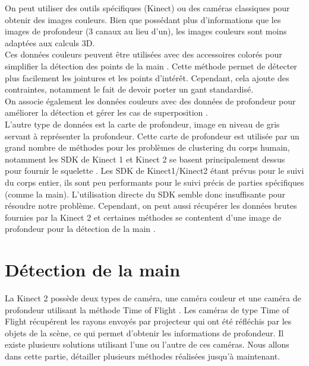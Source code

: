 On peut utiliser des outils spécifiques (Kinect) ou des caméras classiques pour obtenir des images couleurs.
Bien que possédant plus d'informations que les images de profondeur (3 canaux au lieu d'un), les images couleurs sont moins adaptées aux calculs 3D.\\

Ces données couleurs peuvent être utilisées avec des accessoires colorés pour simplifier la détection des points de la main \cite{wang2009real}.
Cette méthode permet de détecter plus facilement les jointures et les points d'intér\^{e}t.
Cependant, cela ajoute des contraintes, notamment le fait de devoir porter un gant standardisé.\\

On associe également les données couleurs avec des données de profondeur pour améliorer la détection et gérer les cas de superposition \cite{van2011combining}.\\

L'autre type de données est la carte de profondeur, image en niveau de gris servant à représenter la profondeur.
Cette carte de profondeur est utilisée par un grand nombre de méthodes pour les problèmes de clustering du corps humain, notamment les SDK de Kinect 1 et Kinect 2 se basent principalement dessus pour fournir le squelette \cite{export:145347}.
Les SDK de Kinect1/Kinect2 étant prévus pour le suivi du corps entier, ils sont peu performants pour le suivi précis de parties spécifiques (comme la main).
L'utilisation directe du SDK semble donc insuffisante pour résoudre notre problème. Cependant, on peut aussi récupérer les données brutes fournies par la Kinect 2 et certaines méthodes se contentent d'une image de profondeur pour la détection de la main \cite{export:238453}.

\section{Détection de la main}

La Kinect 2 possède deux types de caméra, une caméra couleur et une caméra de profondeur utilisant la méthode
\og Time of Flight \fg. Les caméras de type \og Time of Flight \fg
récupérent les rayons envoyés par projecteur qui ont été réfléchis par les objets de la scène, ce qui permet d'obtenir les informations de profondeur.
Il existe plusieurs solutions utilisant l'une ou l'autre de ces caméras. Nous allons
dans cette partie, détailler plusieurs méthodes réalisées jusqu'à maintenant.

